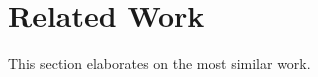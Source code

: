 \documentclass[conference]{IEEEtran}
\begin{document}



\section{Related Work}


This section elaborates on the most similar work.

\end{document}
